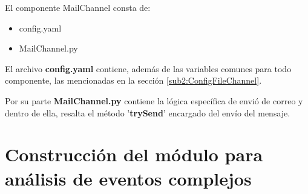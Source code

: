         El componente MailChannel consta de:
        
        \begin{itemize}
            \item config.yaml
            \item MailChannel.py
        \end{itemize}
        
        El archivo \textbf{config.yaml} contiene, además de las variables comunes para todo componente, las mencionadas en la sección \ref{sub2:ConfigFileChannel}.
        
        Por su parte \textbf{MailChannel.py} contiene la lógica específica de envió de correo y dentro de ella, resalta el método '\textbf{trySend}' encargado del envío del mensaje.
\newpage    
    
\section{Construcción del módulo para análisis de eventos complejos}
\label{Sec:AnalyzerModule}

